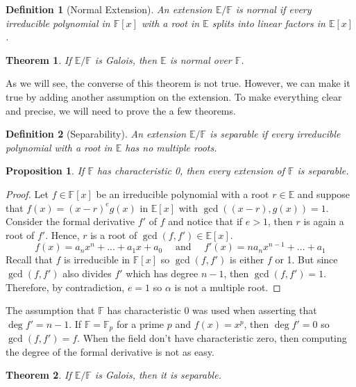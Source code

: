 \documentclass{article}
\newtheorem*{theorem}{Theorem}
\newtheorem*{proposition}{Proposition}
\newtheorem*{definition}{Definition}
\newcommand{\F}{\mathbb{F}}
\newcommand{\E}{\mathbb{E}}
\begin{document}
\begin{definition}[Normal Extension]
    An extension $\E / \F$ is normal if every irreducible polynomial in $\F[x]$ with a root in $\E$ splits into linear factors in $\E[x]$.
\end{definition}

\begin{theorem}
    If $\E / \F$ is Galois, then $\E$ is normal over $\F$.
\end{theorem}

As we will see, the converse of this theorem is not true. However, we can make it true by adding another assumption on the extension. To make everything clear and precise, we will need to prove the a few theorems.

\begin{definition}[Separability]
    An extension $\E / \F$ is separable if every irreducible polynomial with a root in $\E$ has no multiple roots.
\end{definition}

\begin{proposition}
    If $\F$ has characteristic 0, then every extension of $\F$ is separable.
\end{proposition}

\begin{proof}
    Let $f \in \F[x]$ be an irreducible polynomial with a root $r \in \E$ and suppose that $f(x) = (x - r)^eg(x)$ in $\E[x]$ with $\gcd((x - r), g(x)) = 1$. Consider the formal derivative $f'$ of $f$ and notice that if $e > 1$, then $r$ is again a root of $f'$. Hence, $r$ is a root of $\gcd(f, f') \in \E[x]$.
    $$f(x) = a_n x^n + ... + a_1x + a_0 \quad \text{ and } \quad f'(x) = na_n x^{n-1} + ... + a_1$$
    Recall that $f$ is irreducible in $\F[x]$ so $\gcd(f,f')$ is either $f$ or 1. But since $\gcd(f,f')$ also divides $f'$ which has degree $n-1$, then $\gcd(f,f') = 1$. Therefore, by contradiction, $e = 1$ so $\alpha$ is not a multiple root.
\end{proof}

The assumption that $\F$ has characteristic 0 was used when asserting that $\deg f' = n-1$. If $\F = \F_p$ for a prime $p$ and $f(x) = x^p$, then $\deg f' = 0$ so $\gcd(f, f') = f$. When the field don't have characteristic zero, then computing the degree of the formal derivative is not as easy.

\begin{theorem}
    If $\E / \F$ is Galois, then it is separable.
\end{theorem}
\end{document}
